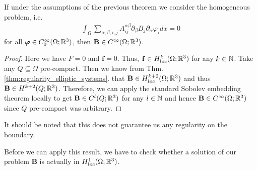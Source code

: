 \documentclass[../master_thesis.tex]{subfiles}
\begin{document}
\begin{corollary}\label{cor:smooth_solution}
    If under the assumptions of the previous theorem we consider the 
    homogeneous problem, i.e.
    \begin{align*}
        \int_\Omega \sum\limits_{\alpha,\beta,i,j} 
        A_{ij}^{\alpha \beta} \partial_\beta B_j \partial_\alpha \varphi_i dx =0
    \end{align*}
    for all $\bm{\varphi} \in C^\infty_0(\Omega;\mathbb{R}^3)$, then $\mathbf{B}\in C^\infty(\Omega;\mathbb{R}^3)$.
\end{corollary}
\begin{proof}
    Here we have $F= 0$ and $\mathbf{f} = 0$. Thus, $\mathbf{f} \in H^k_{loc}(\Omega;\mathbb{R}^3)$ 
    for any $k \in \mathbb{N}$. 
    Take any $Q \subseteq \Omega$ pre-compact. Then we know from 
    Thm.\,\ref{thm:regularity_elliptic_systems}.
    that $\mathbf{B} \in H_{loc}^{k+2}(\Omega;\mathbb{R}^3)$ and thus $\mathbf{B} \in H^{k+2}(Q;\mathbb{R}^3)$.
    Therefore, we can apply the 
    standard Sobolev embedding theorem locally to get $\mathbf{B} \in C^l(Q;\mathbb{R}^3)$ for any 
    $l \in \mathbb{N}$ and hence $\mathbf{B} \in C^\infty(\Omega;\mathbb{R}^3)$ since $Q$ pre-compact
    was arbitrary. 
\end{proof}
It should be noted that this does not guarantee us any regularity on the 
boundary. 

Before we can apply this result, we have to check whether a solution of our 
problem $\mathbf{B}$ is actually in $H^1_{loc}(\Omega;\mathbb{R}^3)$. 
\end{document}
